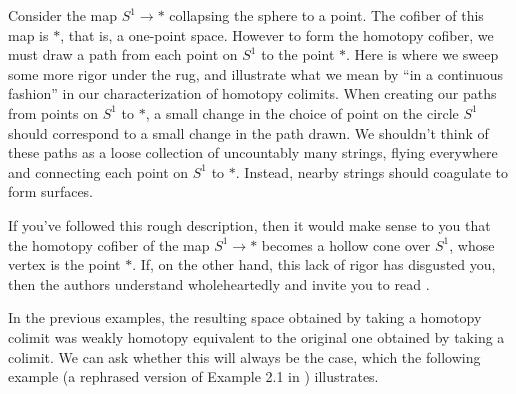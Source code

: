 \begin{example} Consider the map $S^1 \to \ast$ collapsing the sphere to a point. The cofiber of this map is $\ast$, that is, a one-point space. However to form the homotopy cofiber, we must draw a path from each point on $S^1$ to the point $\ast$. Here is where we sweep some more rigor under the rug, and illustrate what we mean by ``in a continuous fashion'' in our characterization of homotopy colimits. When creating our paths from points on $S^1$ to $\ast$, a small change in the choice of point on the circle $S^1$ should correspond to a small change in the path drawn. We shouldn't think of these paths as a loose collection of uncountably many strings, flying everywhere and connecting each point on $S^1$ to $\ast$. Instead, nearby strings should coagulate to form surfaces.

\begin{figure}[H]
  \centering
\end{figure}

If you've followed this rough description, then it would make sense to you that the homotopy cofiber of the map $S^1 \to \ast$ becomes a hollow cone over $S^1$, whose vertex is the point $\ast$. If, on the other hand, this lack of rigor has disgusted you, then the authors understand wholeheartedly and invite you to read \cite{Dugger}.
\end{example}


In the previous examples, the resulting space obtained by taking a homotopy colimit was weakly homotopy equivalent to the original one obtained by taking a colimit. We can ask whether this will always be the case, which the following example (a rephrased version of Example 2.1 in \cite{Dugger}) illustrates.


